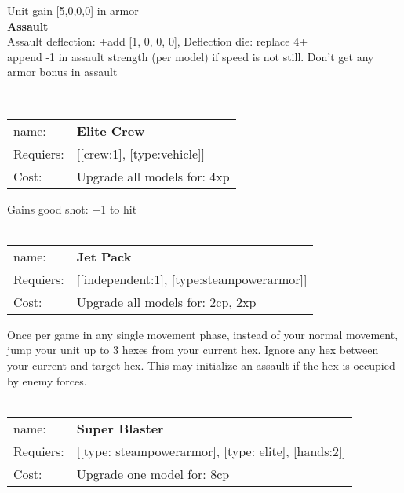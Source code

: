 Unit gain [5,0,0,0] in armor\\ 




{\bf Assault} \ \\
Assault deflection: +add [1, 0, 0, 0], Deflection die: replace 4+
\\ 

append -1 in assault strength (per model) if speed is not still. Don't get any armor bonus in assault


\ \\
\begin{tabular}{ll}
name: & {\bf Elite Crew } \\
Requiers: & [[crew:1], [type:vehicle]] \\
Cost: & Upgrade all models for: 4xp \\
\end{tabular}

Gains good shot: +1 to hit\\ 









\ \\
\begin{tabular}{ll}
name: & {\bf Jet Pack } \\
Requiers: & [[independent:1], [type:steampowerarmor]] \\
Cost: & Upgrade all models for: 2cp, 2xp \\
\end{tabular}

Once per game in any single movement phase, instead of your normal movement, jump your unit up to 3 hexes from your current hex. Ignore any hex between your current and target hex. This may initialize an assault if the hex is occupied by enemy forces.\\ 









\ \\
\begin{tabular}{ll}
name: & {\bf Super Blaster } \\
Requiers: & [[type: steampowerarmor], [type: elite], [hands:2]] \\
Cost: & Upgrade one model for: 8cp \\
\end{tabular}



